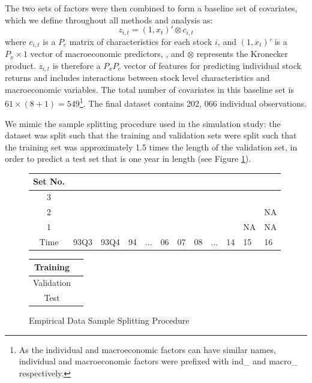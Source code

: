 \documentclass{article}
\begin{document}
The two sets of factors were then combined to form a baseline set of covariates, which we define throughout all methods and analysis as:
\begin{equation}
z_{i,t} = (1, x_t)' \otimes c_{i, t}
\end{equation}
where $c_{i,t}$ is a $P_c$ matrix of characteristics for each stock $i$, and $(1, x_t)'$ is a $P_x \times 1$ vector of macroeconomic predictors, , and $\otimes$ represents the Kronecker product. $z_{i,t}$ is therefore a $P_x P_c$ vector of features for predicting individual stock returns and includes interactions between stock level characteristics and macroeconomic variables. The total number of covariates in this baseline set is $61 \times (8 + 1) = 549$\footnote{As the individual and macroeconomic factors can have similar names, individual and macroeconomic factors were prefixed with ind\_ and macro\_ respectively.}. The final dataset contains 202, 066 individual observations. 

We mimic the sample splitting procedure used in the simulation study: the dataset was split such that the training and validation sets were split such that the training set was approximately 1.5 times the length of the validation set, in order to predict a test set that is one year in length (see Figure \ref{emp_sample_split_diag}).

\begin{figure}[!htb]
	\begin{center}
		\begin{tabular}{|c|p{0.55cm}p{0.55cm}p{0.50cm}p{0.50cm}p{0.50cm}p{0.50cm}p{0.50cm}p{0.50cm}p{0.50cm}p{0.50cm}p{0.50cm}|}
			\hline
			Set No. &&&&&&&&&&& \\
			\hline
			3 & \cellcolor{cyan} & \cellcolor{cyan} & \cellcolor{cyan} & \cellcolor{cyan} & \cellcolor{cyan} & \cellcolor{cyan} & 
			\cellcolor{pink} & \cellcolor{pink} & \cellcolor{pink} & \cellcolor{pink} &  \cellcolor{olive} \\
			2 & \cellcolor{cyan} & \cellcolor{cyan} & \cellcolor{cyan} & \cellcolor{cyan} & \cellcolor{cyan} & 
			\cellcolor{pink} & \cellcolor{pink} & \cellcolor{pink} & \cellcolor{pink} & 	
			\cellcolor{olive} & NA \\
			1 & \cellcolor{cyan} & \cellcolor{cyan} & \cellcolor{cyan} & \cellcolor{cyan} & 
			\cellcolor{pink} & \cellcolor{pink} & \cellcolor{pink} & \cellcolor{pink} &
			\cellcolor{olive} & NA & NA \\
			\hline
			Time & 93Q3 & 93Q4 & 94 & ... & 06 & 07 & 08 & ... & 14 & 15 & 16 \\
			\hline
		\end{tabular}
		\medskip
		\begin{tabular}{|c|p{0.55cm}|}
			\hline
			Training & \cellcolor{cyan} \\
			\hline
			Validation & \cellcolor{pink} \\
			\hline
			Test & \cellcolor{olive} \\
			\hline
		\end{tabular}
	\end{center}
	\caption{Empirical Data Sample Splitting Procedure}
	\label{emp_sample_split_diag}
\end{figure}
\end{document}
